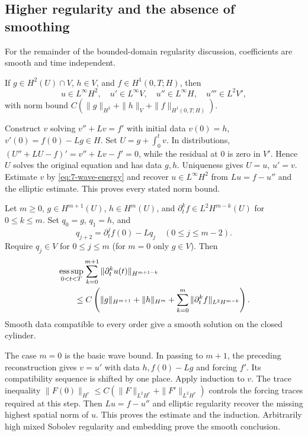 \Needspace{55mm}
\subsection{Higher regularity and the absence of smoothing}
For the remainder of the bounded-domain regularity discussion, coefficients
are smooth and time independent.
\Needspace{55mm}
\begin{theorem}
If $g\in H^2(U)\cap V$, $h\in V$, and $f\in H^1(0,T;H)$, then
\[
 u\in L^\infty H^2,\quad u'\in L^\infty V,\quad
 u''\in L^\infty H,\quad u'''\in L^2V',
\]
with norm bound $C(\|g\|_{H^2}+\|h\|_V+\|f\|_{H^1(0,T;H)})$.
\end{theorem}
\begin{expandedproof}
Construct $v$ solving $v''+Lv=f'$ with initial data
$v(0)=h$, $v'(0)=f(0)-Lg\in H$. Set $U=g+\int_0^t v$.
In distributions,
$(U''+LU-f)'=v''+Lv-f'=0$, while the residual at $0$ is zero in $V'$.
Hence $U$ solves the original equation and has data $g,h$.
Uniqueness gives $U=u$, $u'=v$. Estimate $v$ by
\eqref{eq:7-wave-energy} and recover $u\in L^\infty H^2$ from
$Lu=f-u''$ and the elliptic estimate. This proves every stated norm bound.
\end{expandedproof}
\Needspace{55mm}
\begin{theorem}
Let $m\geq0$, $g\in H^{m+1}(U)$, $h\in H^m(U)$, and
$\partial_t^kf\in L^2H^{m-k}(U)$ for $0\leq k\leq m$.
Set $q_0=g$, $q_1=h$, and
\[
 q_{j+2}=\partial_t^j f(0)-Lq_j\quad(0\leq j\leq m-2).
\]
Require $q_j\in V$ for $0\leq j\leq m$ (for $m=0$ only $g\in V$).
Then
\[
 \begin{split}
 &\mathop{\rm ess\,sup}_{0<t<T}\sum_{k=0}^{m+1}
 \|\partial_t^ku(t)\|_{H^{m+1-k}}\\
 &\qquad\leq C\left(\|g\|_{H^{m+1}}+\|h\|_{H^m}
 +\sum_{k=0}^{m}\|\partial_t^kf\|_{L^2H^{m-k}}\right).
 \end{split}
\]
Smooth data compatible to every order give a smooth solution on the closed cylinder.
\end{theorem}
\begin{expandedproof}
The case $m=0$ is the basic wave bound. In passing to $m+1$, the preceding
reconstruction gives $v=u'$ with data $h,f(0)-Lg$ and forcing $f'$.
Its compatibility sequence is shifted by one place. Apply induction to $v$.
The trace inequality
$\|F(0)\|_{H^r}\leq C(\|F\|_{L^2H^r}+\|F'\|_{L^2H^r})$
controls the forcing traces required at this step.
Then $Lu=f-u''$ and elliptic regularity recover the missing highest spatial
norm of $u$. This proves the estimate and the induction. Arbitrarily high
mixed Sobolev regularity and embedding prove the smooth conclusion.
\end{expandedproof}
\Needspace{55mm}

